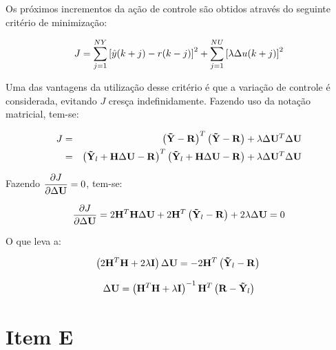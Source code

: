 Os próximos incrementos da ação de controle são obtidos através do seguinte
critério de minimização:

\begin{equation*}
J = \sum_{j=1}^{NY}\left[\hat{y}(k+j)-r(k-j)\right]^2 + 
    \sum_{j=1}^{NU}\left[\lambda\Delta u(k+j)\right]^2
\end{equation*}

Uma das vantagens da utilização desse critério é que a variação de controle é
considerada, evitando $J$ cresça indefinidamente. Fazendo uso da notação
matricial, tem-se:

\begin{eqnarray}
J & = & \left(\mathbf{\tilde{Y}}-\mathbf{R}\right)^T\left(\mathbf{\tilde{Y}}-\mathbf{R}\right) + 
        \lambda\Delta\mathbf{U}^T\Delta\mathbf{U}\nonumber\\
& = & \left(\mathbf{\tilde{Y}}_l+\mathbf{H}\Delta\mathbf{U}-\mathbf{R}\right)^T
      \left(\mathbf{\tilde{Y}}_l+\mathbf{H}\Delta\mathbf{U}-\mathbf{R}\right) + 
      \lambda\Delta\mathbf{U}^T\Delta\mathbf{U}\nonumber
\end{eqnarray}

Fazendo $\displaystyle\frac{\partial J}{\partial\Delta\mathbf{U}} = 0$, tem-se:

\begin{equation*}
\frac{\partial J}{\partial\Delta\mathbf{U}} = 
2\mathbf{H}^T\mathbf{H}\Delta\mathbf{U} + 
2\mathbf{H}^T\left(\mathbf{\tilde{Y}}_l-\mathbf{R}\right) +
2\lambda\Delta\mathbf{U} = 0
\end{equation*}

O que leva a:

\begin{equation*}
\left(2\mathbf{H}^T\mathbf{H} + 2\lambda \mathbf{I}\right)\Delta\mathbf{U} = -
2\mathbf{H}^T\left(\mathbf{\tilde{Y}}_l-\mathbf{R}\right) \\
\end{equation*}

\begin{equation}\label{eq:delta_u}
\Delta\mathbf{U} = \left(\mathbf{H}^T\mathbf{H}+\lambda\mathbf{I}\right)^{-1}\mathbf{H}^T
               \left(\mathbf{R}-\mathbf{\tilde{Y}}_l\right)
\end{equation}

\section*{Item E}
